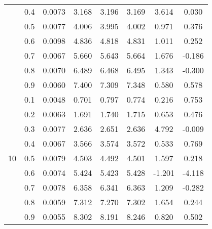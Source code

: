 \documentclass[11pt,a4paper]{report}
\begin{document}
\begin{longtable}{ | c | c || c | c | c | c | c | c | }
 & 0.4 & 0.0073 & 3.168 & 3.196 & 3.169 & 3.614 & 0.030 \\
 & 0.5 & 0.0077 & 4.006 & 3.995 & 4.002 & 0.971 & 0.376 \\
 & 0.6 & 0.0098 & 4.836 & 4.818 & 4.831 & 1.011 & 0.252 \\
 & 0.7 & 0.0067 & 5.660 & 5.643 & 5.664 & 1.676 & -0.186 \\
 & 0.8 & 0.0070 & 6.489 & 6.468 & 6.495 & 1.343 & -0.300 \\
 & 0.9 & 0.0060 & 7.400 & 7.309 & 7.348 & 0.580 & 0.578 \\
 \hline
\multirow{9}{*}{10} & 0.1 & 0.0048 & 0.701 & 0.797 & 0.774 & 0.216 & 0.753 \\
 & 0.2 & 0.0063 & 1.691 & 1.740 & 1.715 & 0.653 & 0.476 \\
 & 0.3 & 0.0077 & 2.636 & 2.651 & 2.636 & 4.792 & -0.009 \\
 & 0.4 & 0.0067 & 3.566 & 3.574 & 3.572 & 0.533 & 0.769 \\
 & 0.5 & 0.0079 & 4.503 & 4.492 & 4.501 & 1.597 & 0.218 \\
 & 0.6 & 0.0074 & 5.424 & 5.423 & 5.428 & -1.201 & -4.118 \\
 & 0.7 & 0.0078 & 6.358 & 6.341 & 6.363 & 1.209 & -0.282 \\
 & 0.8 & 0.0059 & 7.312 & 7.270 & 7.302 & 1.654 & 0.244 \\
 & 0.9 & 0.0055 & 8.302 & 8.191 & 8.246 & 0.820 & 0.502 \\
 \hline
\hline
\end{longtable}
\end{document}

